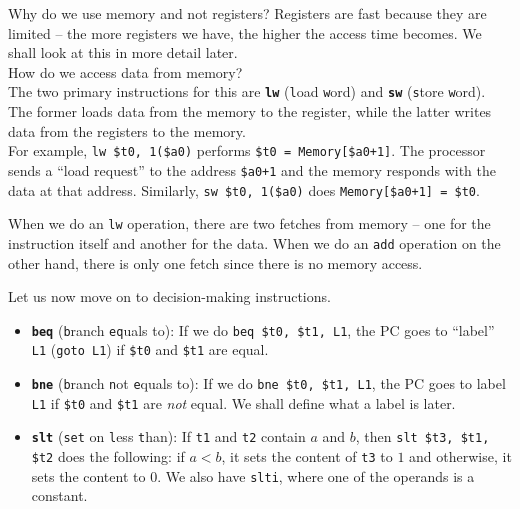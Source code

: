 \documentclass{article}
\begin{document}

		Why do we use memory and not registers? Registers are fast because they are limited -- the more registers we have, the higher the access time becomes. We shall look at this in more detail later.\\

		How do we access data from memory?\\
		The two primary instructions for this are \textbf{\texttt{lw}} (\texttt{l}oad \texttt{w}ord) and \textbf{\texttt{sw}} (\texttt{s}tore \texttt{w}ord). The former loads data from the memory to the register, while the latter writes data from the registers to the memory.\\
		For example, \texttt{lw \$t0, 1(\$a0)} performs \texttt{\$t0 = Memory[\$a0+1]}. The processor sends a ``load request'' to the address \texttt{\$a0+1} and the memory responds with the data at that address. Similarly, \texttt{sw \$t0, 1(\$a0)} does \texttt{Memory[\$a0+1] = \$t0}.

		When we do an \texttt{lw} operation, there are two fetches from memory -- one for the instruction itself and another for the data. When we do an \texttt{add} operation on the other hand, there is only one fetch since there is no memory access.


		Let us now move on to decision-making instructions.
		\begin{itemize}
			\item \textbf{\texttt{beq}} (\texttt{b}ranch \texttt{eq}uals to): If we do \texttt{beq \$t0, \$t1, L1}, the PC goes to ``label'' \texttt{L1} (\texttt{goto L1}) if \texttt{\$t0} and \texttt{\$t1} are equal.%

			\item \textbf{\texttt{bne}} (\texttt{b}ranch \texttt{n}ot \texttt{e}quals to): If we do \texttt{bne \$t0, \$t1, L1}, the PC goes to label \texttt{L1} if \texttt{\$t0} and \texttt{\$t1} are \emph{not} equal. We shall define what a label is later.

			\item \textbf{\texttt{slt}} (\texttt{set} on \texttt{l}ess \texttt{t}han): If \texttt{t1} and \texttt{t2} contain $a$ and $b$, then \texttt{slt \$t3, \$t1, \$t2} does the following: if $a < b$, it sets the content of \texttt{t3} to $1$ and otherwise, it sets the content to $0$.    
			We also have \texttt{slti}, where one of the operands is a constant.
		\end{itemize}
\end{document}
